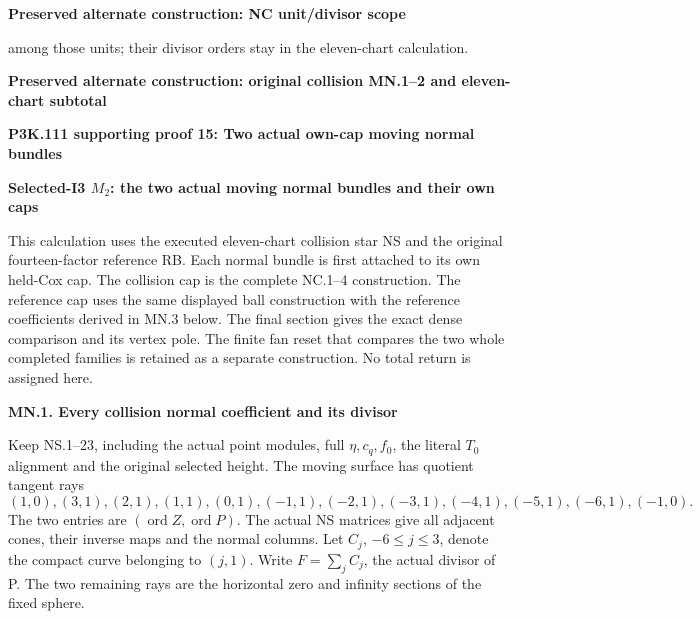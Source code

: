 \par\bigskip\noindent\textbf{Preserved alternate construction: NC unit/divisor scope}\par
among those units; their divisor orders stay in the eleven-chart
calculation.

\par\bigskip\noindent\textbf{Preserved alternate construction: original collision MN.1--2 and eleven-chart subtotal}\par
\par\bigskip\noindent\textbf{P3K.111 supporting proof 15: Two actual own-cap moving normal bundles}\par\nobreak
\par

\medskip\noindent\textbf{Selected-I3 \(M_{2}\): the two actual moving normal bundles and their own caps}

\par\nobreak

This calculation uses the executed eleven-chart collision star NS and
the original fourteen-factor reference RB. Each normal bundle is first
attached to its own held-Cox cap. The collision cap is the complete
NC.1--4 construction. The reference cap uses the same displayed ball
construction with the reference coefficients derived in MN.3 below.
The final section gives the exact dense comparison and its vertex
pole. The finite fan reset that compares the two whole completed
families is retained as a separate construction. No total return is
assigned here.

\par

\medskip\noindent\textbf{MN.1. Every collision normal coefficient and its divisor}

\par\nobreak

Keep NS.1--23, including the actual point modules, full
\(\eta,c_q,f_0\), the literal \(T_0\) alignment and the original
selected height. The moving surface has quotient tangent rays
\[
 (1,0),(3,1),(2,1),(1,1),(0,1),(-1,1),(-2,1),(-3,1),
                  (-4,1),(-5,1),(-6,1),(-1,0).
 \tag{MN.1}
\]
The two entries are \((\operatorname{ord}Z,\operatorname{ord}P)\).
The actual NS matrices give all adjacent cones, their inverse maps
and the normal columns. Let \(C_j\), \(-6\le j\le3\), denote
the compact curve belonging to \((j,1)\). Write \(F=\sum_jC_j\),
the actual divisor of P. The two remaining rays are the horizontal
zero and infinity sections of the fixed sphere.

